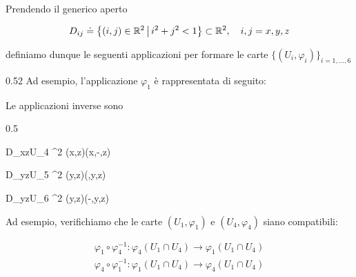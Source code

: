 Prendendo il generico aperto

\begin{equation}
	D_{ij} \doteq \left\{ (i,j) \in \R^{2} \st i^{2}+j^{2}<1 \right\} \subset \R^{2} \qcomma i,j = x,y,z
\end{equation}

definiamo dunque le seguenti applicazioni per formare le carte $ \{(U_{i},\varphi_{i})\}_{i=1,\dots,6} $

		{0.52}{%
			Ad esempio, l'applicazione $ \varphi_{1} $ è rappresentata di seguito:
		}

Le applicazioni inverse sono

	{0.5}{%
				{D_{xz}}{U_{4} \subset \R^{2}}
				{(x,z)}{(x,-,z)}
			
				{D_{yz}}{U_{5} \subset \R^{2}}
				{(y,z)}{(,y,z)}
			
				{D_{yz}}{U_{6} \subset \R^{2}}
				{(y,z)}{(-,y,z)}
			}

Ad esempio, verifichiamo che le carte $ (U_{1},\varphi_{1}) $ e $ (U_{4},\varphi_{4}) $ siano compatibili:

\begin{gather}
	\varphi_{1} \circ \varphi_{4}^{-1} : \varphi_{4}(U_{1} \cap U_{4}) \to \varphi_{1}(U_{1} \cap U_{4}) \\
	\varphi_{4} \circ \varphi_{1}^{-1} : \varphi_{1}(U_{1} \cap U_{4}) \to \varphi_{4}(U_{1} \cap U_{4})
\end{gather}

